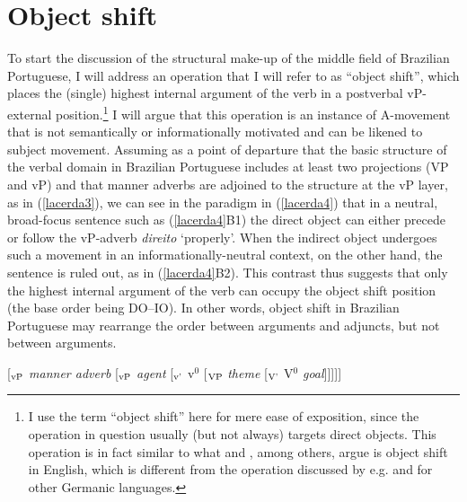 \documentclass[output=paper]{langscibook}
\begin{document}
\section{Object shift}
To start the discussion of the structural make-up of the middle field of Brazilian Portuguese, I will address an operation that I will refer to as “object shift”, which places the (single) highest internal argument of the verb in a postverbal vP-external position.\footnote{I use the term “object shift” here for mere ease of exposition, since the operation in question usually (but not always) targets direct objects. This operation is in fact similar to what \citet{LasnikSaito1991} and \citet{Boskovic1997}, among others, argue is object shift in English, which is different from the operation discussed by e.g. \citet{Holmberg1986} and \citet{Diesing1996} for other Germanic languages.}  I will argue that this operation is an instance of A-movement that is not semantically or informationally motivated and can be likened to subject movement.
Assuming as a point of departure that the basic structure of the verbal domain in Brazilian Portuguese includes at least two projections (VP and vP) and that manner adverbs are adjoined to the structure at the vP layer, as in (\ref{lacerda3}), we can see in the paradigm in (\ref{lacerda4}) that in a neutral, broad-focus sentence such as (\ref{lacerda4}B1) the direct object can either precede or follow the vP-adverb \emph{direito} ‘properly’. When the indirect object undergoes such a movement in an informationally-neutral context, on the other hand, the sentence is ruled out, as in (\ref{lacerda4}B2). This contrast thus suggests that only the highest internal argument of the verb can occupy the object shift position (the base order being DO--IO). In other words, object shift in Brazilian Portuguese may rearrange the order between arguments and adjuncts, but not between arguments.

\begin{exe}
\ex \label{lacerda3}
[$_{\textnormal{vP}}$ \emph{manner adverb} [$_{\textnormal{vP}}$ \emph{agent} [$_{\textnormal{v'}}$ v$^{0}$ [$_{\textnormal{VP}}$ \emph{theme} [$_{\textnormal{V'}}$ V$^{0}$ \emph{goal}]\hspace{0.5mm}]\hspace{0.5mm}]\hspace{0.5mm}]\hspace{0.5mm}]
\end{exe}
\end{document}
